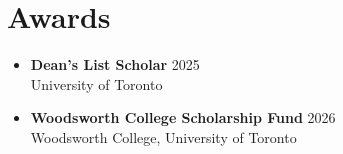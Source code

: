 \documentclass[10.5pt]{article}
\newcommand{\roleline}[2]{\textbf{#1}\hfill \textbf{#2}}
\newcommand{\orgline}[2]{\textit{#1}\hfill \textit{#2}}
\begin{document}

\section*{Awards}
\begin{itemize}
  \item \textbf{Dean’s List Scholar} \hfill 2025 \\
        University of Toronto

  \vspace{8pt}
  \item \textbf{Woodsworth College Scholarship Fund} \hfill 2026 \\
        Woodsworth College, University of Toronto
\end{itemize}
\end{document}
